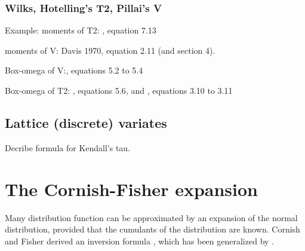 \subsubsection{Wilks, Hotelling's T2, Pillai's V}


Example: moments of T2: \cite{Davis_1968} , equation 7.13

moments of V:  \cite{Davis_1970a} Davis 1970, equation 2.11 (and section 4).

Box-omega of V:\cite{Davis_1970a}, equations 5.2 to 5.4 

Box-omega of T2: \cite{Davis_1970a}, equations 5.6, and \cite{Davis_1970b}, equations 3.10 to 3.11



\subsection{Lattice (discrete) variates}




Decribe formula for Kendall's tau.

\newpage
\section{The Cornish-Fisher expansion}

Many distribution function can be approximated by an expansion of the normal distribution, provided that the cumulants of the distribution are known. Cornish and Fisher derived an inversion formula \citep{fisher_percentile_1960}, which has been generalized by \cite{Lee_1992}.



